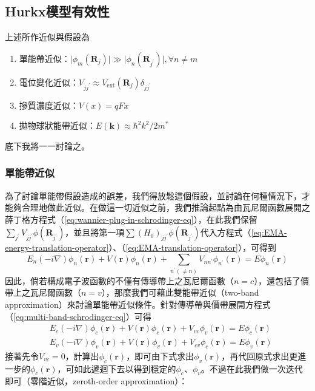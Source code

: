 \subsection{Hurkx模型有效性}
上述所作近似與假設為
\begin{enumerate}
	\item 單能帶近似：$\displaystyle \vert \phi_m(\mathbf{R}_j)\vert \gg \vert \phi_n(\mathbf{R}_{j^\prime})\vert,\forall n\neq m$
	\item 電位變化近似：$\displaystyle V_{jj^\prime}\approx V_\text{ext}(\mathbf{R}_j)\delta_{jj^\prime}$
	\item 摻質濃度近似：$V(x)=qFx$
	\item 拋物球狀能帶近似：$E(\mathbf{k})\approx \hbar^2k^2/2m^*$
\end{enumerate}
底下我將一一討論之。
\subsubsection{單能帶近似}
為了討論單能帶假設造成的誤差，我們得放鬆這個假設，並討論在何種情況下，才能夠合理地做此近似。在做這一切近似之前，我們推論起點為由瓦尼爾函數展開之薛丁格方程式（\ref{eq:wannier-plug-in-schrodinger-eq}），在此我們保留$\sum_{j^\prime}V_{jj^\prime}\phi(\mathbf{R}_{j^\prime})$，並且將第一項$\sum(H_0)_{jj^\prime}\phi(\mathbf{R}_{j^\prime})$代入方程式（\ref{eq:EMA-energy-translation-operator}）、（\ref{eq:EMA-translation-operator}），可得到
\begin{equation}
\label{eq:multi-band-schrodinger-eq}
E_n\left(-i\nabla\right)\phi_n(\mathbf{r})+V(\mathbf{r})\phi_n(\mathbf{r})+\sum_{n^\prime(\neq n)}V_{nn^\prime}\phi_{n^\prime}(\mathbf{r})=E\phi_n(\mathbf{r})
\end{equation}
因此，倘若構成電子波函數的不僅有傳導帶上之瓦尼爾函數（$n=c$），還包括了價帶上之瓦尼爾函數（$n=v$），那麼我們可藉此雙能帶近似（two-band approximation）來討論單能帶近似條件。針對傳導帶與價帶展開方程式（\ref{eq:multi-band-schrodinger-eq}）可得
\begin{equation}
\begin{aligned}
&E_c(-i\nabla)\phi_c(\mathbf{r})+V(\mathbf{r})\phi_c(\mathbf{r})+V_{vc}\phi_v(\mathbf{r})=E\phi_c(\mathbf{r})\\[5pt]
&E_v(-i\nabla)\phi_v(\mathbf{r})+V(\mathbf{r})\phi_v(\mathbf{r})+V_{cv}\phi_c(\mathbf{r})=E\phi_v(\mathbf{r})
\end{aligned}
\end{equation}
接著先令$V_{vc}=0$，計算出$\phi_c(\mathbf{r})$，即可由下式求出$\phi_v(\mathbf{r})$，再代回原式求出更進一步的$\phi_c(\mathbf{r})$，可如此遞迴下去以得到穩定的$\phi_c$、$\phi_v$。不過在此我們做一次迭代即可（零階近似，zeroth-order approximation）：
